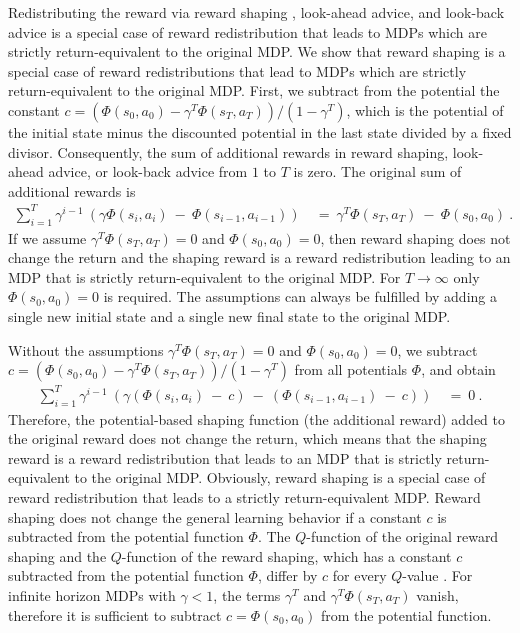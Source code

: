 \documentclass{article}
\begin{document}
\begin{appendices}
Redistributing the reward via
reward shaping \cite{Ng:99,Wiewiora:03}, look-ahead advice, and
look-back advice \cite{Wiewiora:03icml} is 
a special case of reward redistribution that leads to MDPs 
which are strictly return-equivalent to the original MDP.
We show that reward shaping is a special case of
reward redistributions that lead to MDPs 
which are strictly return-equivalent to the original MDP. 
First, we subtract from the potential the constant 
$c=(\Phi(s_0,a_0) - \gamma^T \Phi(s_T,a_T) )/ (1-\gamma^T)$,
which is the potential of the initial state minus the 
discounted potential in the last state divided by a fixed divisor. 
Consequently, the sum of additional rewards in reward shaping, 
look-ahead advice, or look-back advice from $1$ to $T$ is zero.
The original sum of additional rewards is
\begin{align}
 \sum_{i=1}^{T} \gamma^{i-1} \ (\gamma \Phi(s_i,a_i) \ - \  \Phi(s_{i-1},a_{i-1}) )
 \ &= \ \gamma^T \Phi(s_T,a_T) \ - \ \Phi(s_0,a_0) \ .
\end{align}
If we assume $\gamma^T \Phi(s_T,a_T)=0$ and $\Phi(s_0,a_0)=0$,
then reward shaping does not change the return and 
the shaping reward is a reward 
redistribution leading to an MDP that is 
strictly return-equivalent to the original MDP.
For $T\to \infty$ only
$\Phi(s_0,a_0)=0$ is required.
The assumptions can always be fulfilled by adding a single new initial
state and a single new final state to the original MDP.

Without the assumptions $\gamma^T \Phi(s_T,a_T)=0$ and $\Phi(s_0,a_0)=0$, 
we subtract $c=(\Phi(s_0,a_0) - \gamma^T \Phi(s_T,a_T) )/ (1-\gamma^T)$
from all
potentials $\Phi$, and obtain
\begin{align}
 \sum_{i=1}^{T} \gamma^{i-1} \ (\gamma (\Phi(s_i,a_i) \ - \ c) 
 \ - \  (\Phi(s_{i-1},a_{i-1}) \ - \ c ) )
 \ &= \ 0 \ .
\end{align}
Therefore, the potential-based shaping function (the additional reward)
added to the original reward does not change the return, which means
that the shaping reward is a reward 
redistribution that leads to an MDP that is 
strictly return-equivalent to the original MDP.
Obviously, reward shaping is a special case of reward
redistribution that leads to a strictly 
return-equivalent MDP.
Reward shaping does not change the general learning behavior if a constant $c$
is subtracted from the potential function $\Phi$. 
The $Q$-function of the original reward shaping and the $Q$-function of
the reward shaping, which has a constant $c$
subtracted from the potential function $\Phi$, differ by $c$
for every $Q$-value \cite{Ng:99,Wiewiora:03}.
For infinite horizon MDPs with $\gamma<1$, 
the terms $\gamma^T$ and $\gamma^T \Phi(s_T,a_T)$ 
vanish, therefore it is sufficient to subtract $c=\Phi(s_0,a_0)$ from the
potential function.  



\end{appendices}
\end{document}
